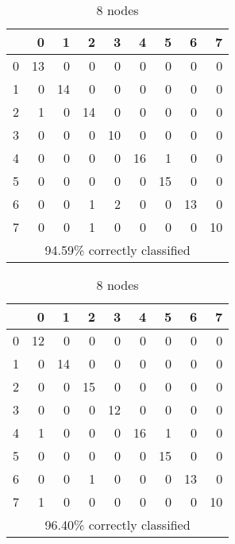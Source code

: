 \documentclass[a4paper]{article}
\begin{document}
\begin{table}[h]
  \centering
  \begin{subtable}{0.6\textwidth}
    \centering
    \begin{tabular}{r|rrrrrrrr}
      &  0 &  1 &  2 &  3 &  4 &  5 &  6 &  7 \\
      \hline
      0 & 13 &  0 &  0 &  0 &  0 &  0 &  0 &  0 \\
      1 &  0 & 14 &  0 &  0 &  0 &  0 &  0 &  0 \\
      2 &  1 &  0 & 14 &  0 &  0 &  0 &  0 &  0 \\
      3 &  0 &  0 &  0 & 10 &  0 &  0 &  0 &  0 \\
      4 &  0 &  0 &  0 &  0 & 16 &  1 &  0 &  0 \\
      5 &  0 &  0 &  0 &  0 &  0 & 15 &  0 &  0 \\
      6 &  0 &  0 &  1 &  2 &  0 &  0 & 13 &  0 \\
      7 &  0 &  0 &  1 &  0 &  0 &  0 &  0 & 10 \\
      \hline
      \multicolumn{9}{c}{94.59\% correctly classified}
    \end{tabular}
    \label{tab:h6}
    \caption{6 nodes}
  \end{subtable}

  \begin{subtable}{0.6\textwidth}
    \centering
    \begin{tabular}{r|rrrrrrrr}
      &  0 &  1 &  2 &  3 &  4 &  5 &  6 &  7 \\
      \hline
      0 & 12 &  0 &  0 &  0 &  0 &  0 &  0 &  0 \\
      1 &  0 & 14 &  0 &  0 &  0 &  0 &  0 &  0 \\
      2 &  0 &  0 & 15 &  0 &  0 &  0 &  0 &  0 \\
      3 &  0 &  0 &  0 & 12 &  0 &  0 &  0 &  0 \\
      4 &  1 &  0 &  0 &  0 & 16 &  1 &  0 &  0 \\
      5 &  0 &  0 &  0 &  0 &  0 & 15 &  0 &  0 \\
      6 &  0 &  0 &  1 &  0 &  0 &  0 & 13 &  0 \\
      7 &  1 &  0 &  0 &  0 &  0 &  0 &  0 & 10 \\
      \hline
      \multicolumn{9}{c}{96.40\% correctly classified}
    \end{tabular}
    \caption{8 nodes}
  \end{subtable}


\end{table}
\end{document}
